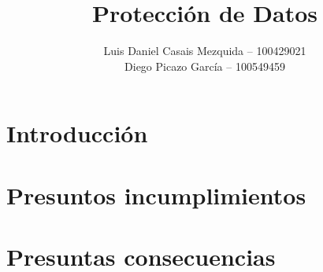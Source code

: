 \documentclass[es]{uc3mreport}
\author{
    Luis Daniel Casais Mezquida -- 100429021\\
    Diego Picazo García -- 100549459
}
\title{Protección de Datos}
\begin{document}
    \makecover


    \begin{report}
        \section{Introducción}


        \section{Presuntos incumplimientos}




        \section{Presuntas consecuencias}


    \end{report}

    \label{bibliography}
    \printbibliography[heading=bibintoc,title={Referencias}]
\end{document}
